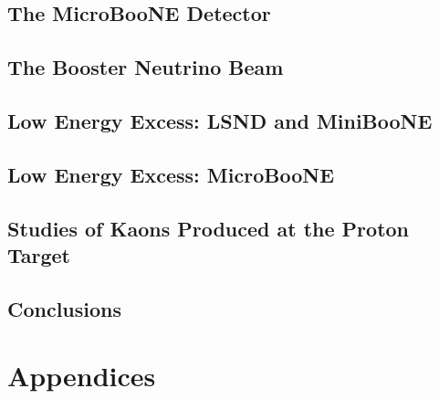 \documentclass[11pt,openright,oneside,letterpaper,onecolumn]{report}  %
\begin{document}
\chapter{The MicroBooNE Detector}
\label{sec:detector}


\chapter{The Booster Neutrino Beam}
\label{sec:beam}


\chapter{Low Energy Excess: LSND and MiniBooNE}
\label{sec:LEEhistory}


\chapter{Low Energy Excess: MicroBooNE}
\label{sec:LEEsensitivity}


\chapter{Studies of Kaons Produced at the Proton Target}
\label{sec:kaon}


% 

\chapter{Conclusions}
\label{sec:conclusions}


 



\part{Appendices}
\appendix

\end{document}
